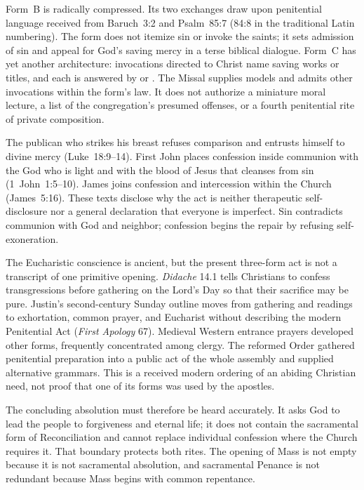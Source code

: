 Form~B is radically compressed. Its two exchanges draw upon penitential language received from Baruch~3:2 and Psalm~85:7 (84:8 in the traditional Latin numbering). The form does not itemize sin or invoke the saints; it sets admission of sin and appeal for God's saving mercy in a terse biblical dialogue. Form~C has yet another architecture: invocations directed to Christ name saving works or titles, and each is answered by  or . The Missal supplies models and admits other invocations within the form's law. It does not authorize a miniature moral lecture, a list of the congregation's presumed offenses, or a fourth penitential rite of private composition.

The publican who strikes his breast refuses comparison and entrusts himself to divine mercy (Luke~18:9--14). First John places confession inside communion with the God who is light and with the blood of Jesus that cleanses from sin (1~John~1:5--10). James joins confession and intercession within the Church (James~5:16). These texts disclose why the act is neither therapeutic self-disclosure nor a general declaration that everyone is imperfect. Sin contradicts communion with God and neighbor; confession begins the repair by refusing self-exoneration.

The Eucharistic conscience is ancient, but the present three-form act is not a transcript of one primitive opening. \emph{Didache} 14.1 tells Christians to confess transgressions before gathering on the Lord's Day so that their sacrifice may be pure. Justin's second-century Sunday outline moves from gathering and readings to exhortation, common prayer, and Eucharist without describing the modern Penitential Act (\emph{First Apology} 67). Medieval Western entrance prayers developed other forms, frequently concentrated among clergy. The reformed Order gathered penitential preparation into a public act of the whole assembly and supplied alternative grammars. This is a received modern ordering of an abiding Christian need, not proof that one of its forms was used by the apostles.

The concluding absolution must therefore be heard accurately. It asks God to lead the people to forgiveness and eternal life; it does not contain the sacramental form of Reconciliation and cannot replace individual confession where the Church requires it. That boundary protects both rites. The opening of Mass is not empty because it is not sacramental absolution, and sacramental Penance is not redundant because Mass begins with common repentance.

